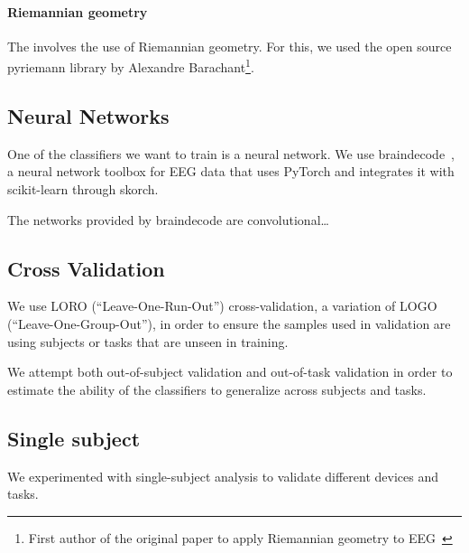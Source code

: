         \paragraph{Riemannian geometry}

            The  involves the use of Riemannian geometry. For this, we used the open source pyriemann library by Alexandre Barachant\footnote{First author of the original paper to apply Riemannian geometry to EEG~\cite{barachant_classification_2013}}.

    \subsection{Neural Networks}

        One of the classifiers we want to train is a neural network. We use braindecode~\cite{schirrmeister_deep_2017}\cite{noauthor_braindecode_2021}, a neural network toolbox for EEG data that uses PyTorch and integrates it with scikit-learn through skorch.

        The networks provided by braindecode are convolutional\ldots

    \subsection{Cross Validation}

        We use LORO (``Leave-One-Run-Out'') cross-validation, a variation of LOGO (``Leave-One-Group-Out''), in order to ensure the samples used in validation are using subjects or tasks that are unseen in training.

        We attempt both out-of-subject validation and out-of-task validation in order to estimate the ability of the classifiers to generalize across subjects and tasks.

    \subsection{Single subject}

        We experimented with single-subject analysis to validate different devices and tasks.
